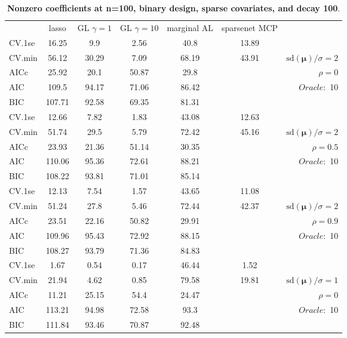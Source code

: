 \begin{table}\vspace{-.5cm}
\caption[l]{ { \bf Nonzero coefficients at n=100, binary design, 
sparse covariates, and  decay  100}.}
\vspace{-.5cm}
\footnotesize{}
\begin{center}
\begin{tabular}{l*{5}{c}|r}
& lasso & GL $\gamma=1$ & GL $\gamma=10$ & marginal AL & sparsenet MCP  & \\
 \cline{1-7}
CV.1se & 16.25 & 9.9 & 2.56 & 40.8 & 13.89 & \\
CV.min & 56.12 & 30.29 & 7.09 & 68.19 & 43.91 &  $\mathrm{sd}(\mathbf{\mu})/\sigma=2$ \\
AICc & 25.92 & 20.1 & 50.87 & 29.8 & & $\rho=0$ \\
AIC & 109.5 & 94.17 & 71.06 & 86.42 & &  \multirow{2}{*}{$Oracle: $ 10} \\
BIC & 107.71 & 92.58 & 69.35 & 81.31 & &  \\
 \hline 
CV.1se & 12.66 & 7.82 & 1.83 & 43.08 & 12.63 & \\
CV.min & 51.74 & 29.5 & 5.79 & 72.42 & 45.16 &  $\mathrm{sd}(\mathbf{\mu})/\sigma=2$ \\
AICc & 23.93 & 21.36 & 51.14 & 30.35 & & $\rho=0.5$ \\
AIC & 110.06 & 95.36 & 72.61 & 88.21 & &  \multirow{2}{*}{$Oracle: $ 10} \\
BIC & 108.22 & 93.81 & 71.01 & 85.14 & &  \\
 \hline 
CV.1se & 12.13 & 7.54 & 1.57 & 43.65 & 11.08 & \\
CV.min & 51.24 & 27.8 & 5.46 & 72.44 & 42.37 &  $\mathrm{sd}(\mathbf{\mu})/\sigma=2$ \\
AICc & 23.51 & 22.16 & 50.82 & 29.91 & & $\rho=0.9$ \\
AIC & 109.96 & 95.43 & 72.92 & 88.15 & &  \multirow{2}{*}{$Oracle: $ 10} \\
BIC & 108.27 & 93.79 & 71.36 & 84.83 & &  \\
 \hline 
CV.1se & 1.67 & 0.54 & 0.17 & 46.44 & 1.52 & \\
CV.min & 21.94 & 4.62 & 0.85 & 79.58 & 19.81 &  $\mathrm{sd}(\mathbf{\mu})/\sigma=1$ \\
AICc & 11.21 & 25.15 & 54.4 & 24.47 & & $\rho=0$ \\
AIC & 113.21 & 94.98 & 72.58 & 93.3 & &  \multirow{2}{*}{$Oracle: $ 10} \\
BIC & 111.84 & 93.46 & 70.87 & 92.48 & &  \\

\end{tabular}
\end{center}
\end{table}
